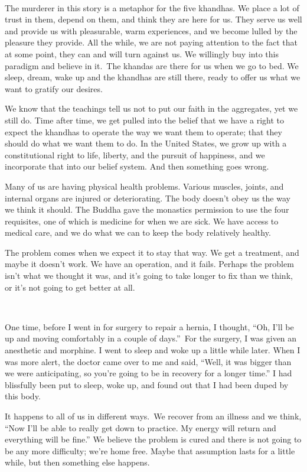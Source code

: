 ~

The murderer in this story is a metaphor for the five khandhas. We place a lot of trust in them, depend on them, and think they are here for us. They serve us well and provide us with pleasurable, warm experiences, and we become lulled by the pleasure they provide. All the while, we are not paying attention to the fact that at some point, they can and will turn against us. We willingly buy into this paradigm and believe in it.~The khandas are there for us when we go to bed. We sleep, dream, wake up and the khandhas are still there, ready to offer us what we want to gratify our desires.~

We know that the teachings tell us not to put our faith in the aggregates, yet we still do. Time after time, we get pulled into the belief that we have a right to expect the khandhas to operate the way we want them to operate; that they should do what we want them to do. In the United States, we grow up with a constitutional right to life, liberty, and the pursuit of happiness, and we incorporate that into our belief system. And then something goes wrong.

Many of us are having physical health problems. Various muscles, joints, and internal organs are injured or deteriorating. The body doesn't obey us the way we think it should. The Buddha gave the monastics permission to use the four requisites, one of which is medicine for when we are sick. We have access to medical care, and we do what we can to keep the body relatively healthy.~

The problem comes when we expect it to stay that way. We get a treatment, and maybe it doesn't work. We have an operation, and it fails. Perhaps the problem isn't what we thought it was, and it's going to take longer to fix than we think, or it's not going to get better at all.~

~

One time, before I went in for surgery to repair a hernia, I thought, ``Oh, I'll be up and moving comfortably in a couple of days.''~For the surgery, I was given an anesthetic and morphine. I went to sleep and woke up a little while later. When I was more alert, the doctor came over to me and said, ``Well, it was bigger than we were anticipating, so you're going to be in recovery for a longer time.'' I had blissfully been put to sleep, woke up, and found out that I had been duped by this body.~

It happens to all of us in different ways.~We recover from an illness and we think, ``Now I'll be able to really get down to practice. My energy will return and everything will be fine.'' We believe the problem is cured and there is not going to be any more difficulty; we're home free. Maybe that assumption lasts for a little while, but then something else happens.~

